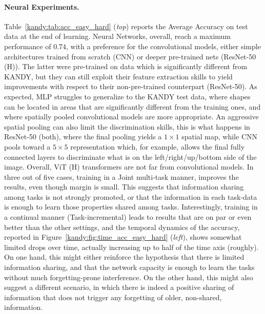 \paragraph{Neural Experiments.}
Table~\ref{kandy:tab:acc_easy_hard} ({\it top}) reports the {\sc\small Average Accuracy} on test data at the end of learning. Neural Networks, overall, reach a maximum performance of $0.74$, with a preference for the convolutional models, either simple architectures trained from scratch ({\small\sc CNN}) or deeper pre-trained nets ({\small\sc ResNet-50 (H)}). The latter were pre-trained on data which is significantly different from \textsc{KANDY}, but they can still exploit their feature extraction skills to yield improvements with respect to their non-pre-trained counterpart ({\small\sc ResNet-50}). As expected, {\sc\small MLP} struggles to generalize to the \textsc{KANDY} test data, where shapes can be located in areas that are significantly different from the training ones, and where spatially pooled convolutional models are more appropriate. An aggressive spatial pooling can also limit the discrimination skills, this is what happens in {\sc\small ResNet-50} (both), where the final pooling yields a $1\times 1$ spatial map, while {\sc\small CNN} pools toward a $5\times 5$ representation which, for example, allows the final fully connected layers to discriminate what is on the left/right/up/bottom side of the image. Overall, {\sc\small ViT (H)} transformers are not far from convolutional models. 
In three out of five cases, training in a {\sc\small Joint} multi-task manner, improves the results, even though margin is small. This suggests that information sharing among tasks is not strongly promoted, or that the information in each task-data is enough to learn those properties shared among tasks. 
Interestingly, training in a continual manner ({\sc\small Task-incremental}) leads to results that are on par or even better than the other settings, and the temporal dynamics of the accuracy, reported in Figure~\ref{kandy:fig:time_acc_easy_hard} ({\it left}), shows somewhat limited drops over time, actually increasing up to half of the time axis (roughly). On one hand, this might either reinforce the hypothesis that there is limited information sharing, and that the network capacity is enough to learn the tasks without much forgetting-prone interference. On the other hand, this might also suggest a different scenario, in which there is indeed a positive sharing of information that does not trigger any forgetting of older, non-shared, information.
